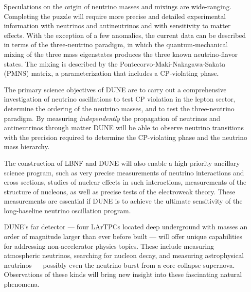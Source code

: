 Speculations on the origin of neutrino masses and mixings are wide-ranging. 
Completing the puzzle will require more precise and detailed experimental information with neutrinos and antineutrinos and with sensitivity to matter effects. With the exception of a few anomalies, the current data can be described in terms of the three-neutrino paradigm, in which the 
quantum-mechanical mixing of the three mass eigenstates produces the three known neutrino-flavor states.  The mixing is described by the Pontecorvo-Maki-Nakagawa-Sakata (PMNS) matrix, a parameterization that includes a CP-violating phase. 

The primary science objectives %
of DUNE are to carry out a comprehensive investigation of neutrino oscillations to test CP violation in the lepton sector, determine the ordering of the neutrino masses, and to test the three-neutrino paradigm.
By measuring \textit{independently} the  propagation of neutrinos and antineutrinos through matter DUNE will be able to observe %
neutrino transitions with the precision required to determine the 
CP-violating phase and %
the neutrino mass hierarchy.

The construction of LBNF and DUNE will also enable a high-priority ancillary science program, such as 
very precise measurements of neutrino interactions and cross sections, studies of nuclear effects in such interactions, measurements of the structure of nucleons, as well as precise tests of the electroweak theory. 
These measurements are essential if DUNE is to achieve the ultimate sensitivity of the long-baseline neutrino oscillation program. %

DUNE's far detector --- four LArTPCs located deep underground with masses an order of magnitude larger than ever before built  ---  %
will offer unique capabilities for addressing %
non-accelerator physics topics. These include measuring atmospheric neutrinos, searching for nucleon decay, and measuring astrophysical neutrinos --- possibly even %
the neutrino burst %
from a core-collapse supernova. 
Observations of these kinds will bring new insight into these fascinating natural phenomena. 

